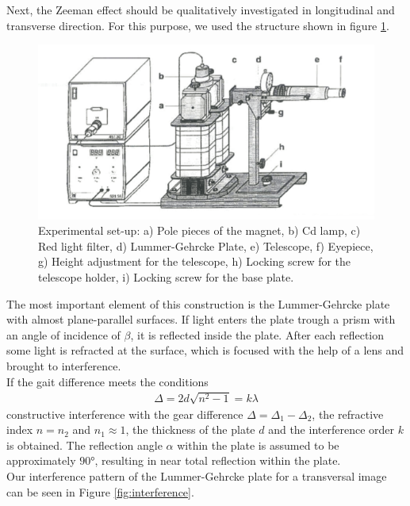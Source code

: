 Next, the Zeeman effect should be qualitatively investigated in longitudinal and transverse direction.
For this purpose, we used the structure shown in figure \ref{fig:structure}.
\begin{figure}[ht]
\centering
\includegraphics[scale=.9]{images//structure.png}
\caption{Experimental set-up: a) Pole pieces of the magnet, b) Cd lamp, c) Red light filter, d) Lummer-Gehrcke Plate, e) Telescope, f) Eyepiece, g) Height adjustment for the telescope, h) Locking screw for the telescope holder, i) Locking screw for the base plate. \cite{leaflets}}
\label{fig:structure}
\end{figure}
The most important element of this construction is the Lummer-Gehrcke plate with almost plane-parallel surfaces.
If light enters the plate trough a prism with an angle of incidence of $\beta$, it is reflected inside the plate.
After each reflection some light is refracted at the surface, which is focused with the help of a lens and brought to interference.\\
If the gait difference meets the conditions
\begin{align}
\Delta = 2d\sqrt{n^2-1} = k \lambda
\end{align}
constructive interference with the gear difference $\Delta=\Delta_1-\Delta_2$, the refractive index $n=n_2$ and $n_1\approx1$, the thickness of the plate $d$ and the interference order $k$ is obtained.
The reflection angle $\alpha$ within the plate is assumed to be approximately $90°$, resulting in near total reflection within the plate.\\
Our interference pattern of the Lummer-Gehrcke plate for a transversal image can be seen in Figure \ref{fig:interference}.
